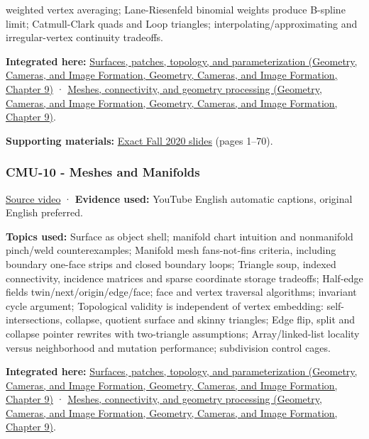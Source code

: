 weighted vertex averaging; Lane-Riesenfeld binomial weights produce B-spline limit; Catmull-Clark quads and Loop triangles; interpolating/approximating and irregular-vertex continuity tradeoffs.

\textbf{Integrated here:} \href{../03-Geometry-Cameras-and-Image-Formation/main.pdf\#nameddest=03-visual-computing-i-ch002-surfaces-patches-topology-and-parameterization}{Surfaces, patches, topology, and parameterization (Geometry, Cameras, and Image Formation, Geometry, Cameras, and Image Formation, Chapter 9)} · \href{../03-Geometry-Cameras-and-Image-Formation/main.pdf\#nameddest=03-visual-computing-i-ch002-meshes-connectivity-and-geometry-processing}{Meshes, connectivity, and geometry processing (Geometry, Cameras, and Image Formation, Geometry, Cameras, and Image Formation, Chapter 9)}.

\textbf{Supporting materials:} \href{https://15462.courses.cs.cmu.edu/fall2020content/lectures/09_introgeometry/09_introgeometry_slides.pdf}{Exact Fall 2020 slides} (pages 1--70).

\subsubsection{CMU-10 - Meshes and Manifolds}\label{04-visual-computing-ii-ch036-cmu-10---meshes-and-manifolds}

\href{https://www.youtube.com/watch?v=HePDHsp8spU}{Source video} · \textbf{Evidence used:} YouTube English automatic captions, original English preferred.

\textbf{Topics used:} Surface as object shell; manifold chart intuition and nonmanifold pinch/weld counterexamples; Manifold mesh fans-not-fins criteria, including boundary one-face strips and closed boundary loops; Triangle soup, indexed connectivity, incidence matrices and sparse coordinate storage tradeoffs; Half-edge fields twin/next/origin/edge/face; face and vertex traversal algorithms; invariant cycle argument; Topological validity is independent of vertex embedding: self-intersections, collapse, quotient surface and skinny triangles; Edge flip, split and collapse pointer rewrites with two-triangle assumptions; Array/linked-list locality versus neighborhood and mutation performance; subdivision control cages.

\textbf{Integrated here:} \href{../03-Geometry-Cameras-and-Image-Formation/main.pdf\#nameddest=03-visual-computing-i-ch002-surfaces-patches-topology-and-parameterization}{Surfaces, patches, topology, and parameterization (Geometry, Cameras, and Image Formation, Geometry, Cameras, and Image Formation, Chapter 9)} · \href{../03-Geometry-Cameras-and-Image-Formation/main.pdf\#nameddest=03-visual-computing-i-ch002-meshes-connectivity-and-geometry-processing}{Meshes, connectivity, and geometry processing (Geometry, Cameras, and Image Formation, Geometry, Cameras, and Image Formation, Chapter 9)}.

